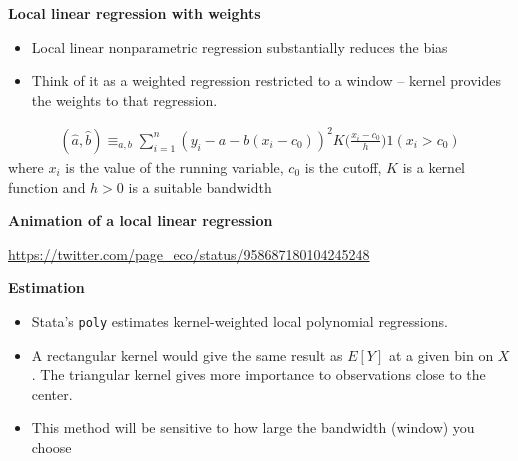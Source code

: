 \documentclass[notes=show]{beamer}
\begin{document}
\begin{frame}[plain]
	\begin{center}
	\textbf{Local linear regression with weights}
	\end{center}
	
	\begin{itemize}
	\item Local linear nonparametric regression substantially reduces the bias
	\item Think of it as a weighted regression restricted to a window -- kernel provides the weights to that regression.  
	\end{itemize}\begin{eqnarray*}
	(\widehat{a}, \widehat{b}) \equiv_{a,b} \sum_{i=1}^n (y_i - a - b(x_i-c_0))^2 K\bigg ( \frac{x_i - c_0}{h} \bigg ) 1(x_i > c_0)
	\end{eqnarray*}where $x_i$ is the value of the running variable, $c_0$ is the cutoff, $K$ is a kernel function and $h>0$ is a suitable bandwidth
\end{frame}

\begin{frame}[plain]
\begin{center}
\textbf{Animation of a local linear regression}
\end{center}

\url{https://twitter.com/page_eco/status/958687180104245248}

\end{frame}

\begin{frame}[plain]
\begin{center}
\textbf{Estimation}
\end{center}

\begin{itemize}
	\item Stata's \texttt{poly} estimates kernel-weighted local polynomial regressions.  
	\item A rectangular kernel would give the same result as $E[Y]$ at a given bin on $X$.  The triangular kernel gives more importance to observations close to the center.
	\item This method will be sensitive to how large the bandwidth (window) you choose
\end{itemize}

\end{frame}
\end{document}
